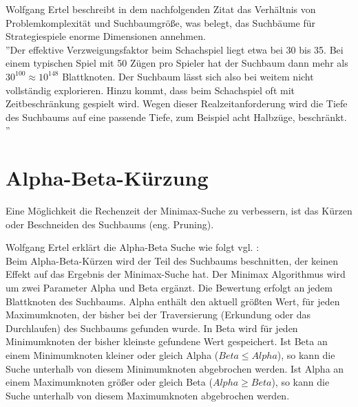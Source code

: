 Wolfgang Ertel beschreibt in dem nachfolgenden Zitat das Verhältnis von Problemkomplexität und Suchbaumgröße, was belegt, das Suchbäume für Strategiespiele enorme Dimensionen annehmen.\\

''Der effektive Verzweigungsfaktor beim Schachspiel liegt etwa bei 30 bis 35. Bei einem typischen Spiel mit 50 Zügen pro Spieler hat der Suchbaum dann mehr als $30^{100} \approx 10^{148}$ Blattknoten. Der Suchbaum lässt sich also bei weitem nicht vollständig explorieren. Hinzu kommt, dass beim Schachspiel oft mit Zeitbeschränkung gespielt wird. Wegen dieser Realzeitanforderung wird die Tiefe des Suchbaums auf eine passende Tiefe, zum Beispiel acht Halbzüge, beschränkt. \cite[114 \psq]{Ertel}'' \\

\section{Alpha-Beta-Kürzung}
\label{sec:Alpha-Beta-Kürzung}
Eine Möglichkeit die Rechenzeit der Minimax-Suche zu verbessern, ist das Kürzen oder Beschneiden des Suchbaums (eng. Pruning). 

Wolfgang Ertel erklärt die Alpha-Beta Suche wie folgt vgl. \cite[116]{Ertel}:\\
Beim Alpha-Beta-Kürzen wird der Teil des Suchbaums beschnitten, der keinen Effekt auf das Ergebnis der Minimax-Suche hat. Der Minimax Algorithmus wird um zwei Parameter Alpha und Beta ergänzt. Die Bewertung erfolgt an jedem Blattknoten des Suchbaums. Alpha enthält den aktuell größten Wert, für jeden Maximumknoten, der bisher bei der Traversierung (Erkundung oder das Durchlaufen) des Suchbaums gefunden wurde. In Beta wird für jeden Minimumknoten der bisher kleinste gefundene Wert gespeichert. Ist Beta an einem Minimumknoten kleiner oder gleich Alpha ($Beta \leq Alpha$), so kann die Suche unterhalb von diesem Minimumknoten abgebrochen werden. Ist Alpha an einem Maximumknoten größer oder gleich Beta ($Alpha \geq Beta$), so kann die Suche unterhalb von diesem Maximumknoten abgebrochen werden. \\

